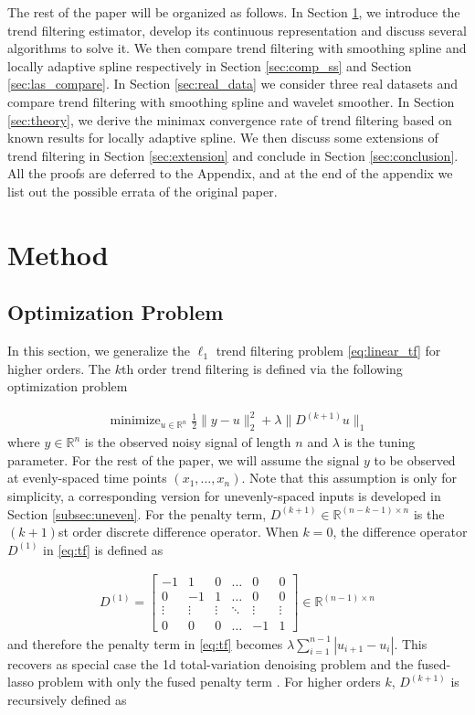\documentclass[a4paper]{article}
\newcommand{\RR}{\mathbb{R}}
\DeclareMathOperator*{\minimize}{minimize}
\begin{document}
The rest of the paper will be organized as follows. In Section \ref{sec:method}, we introduce the trend filtering estimator, develop its continuous representation and discuss several algorithms to solve it. We then compare trend filtering with smoothing spline and locally adaptive spline respectively in Section \ref{sec:comp_ss} and Section \ref{sec:las_compare}. In Section \ref{sec:real_data}  we consider three real datasets and compare trend filtering with smoothing spline and wavelet smoother. In Section \ref{sec:theory}, we derive the minimax convergence rate of trend filtering based on known results for locally adaptive spline. We then discuss some extensions of trend filtering in Section \ref{sec:extension} and conclude in Section \ref{sec:conclusion}. All the proofs are deferred to the Appendix, and at the end of the appendix we list out the possible errata of the original paper.


\section{Method}
\label{sec:method}

\subsection{Optimization Problem}
\label{subsec:opt_problem}
In this section, we generalize the $\ell_1$ trend filtering problem \eqref{eq:linear_tf} for higher orders. The $k$th order trend filtering is defined via the following optimization problem

\begin{align}
\minimize_{u\in\RR^n} \frac{1}{2}\|y-u\|_2^2 + \lambda\|D^{(k+1)}u\|_1  
\label{eq:tf}
\end{align}
where $y\in\RR^n$ is the observed noisy signal of length $n$ and $\lambda$ is the tuning parameter. For the rest of the paper, we will assume the signal $y$ to be observed at evenly-spaced time points $(x_1,\ldots, x_n)$. Note that this assumption is only for simplicity, a corresponding version for unevenly-spaced inputs is developed in Section \ref{subsec:uneven}. For the penalty term, $D^{(k+1)}\in\RR^{(n-k-1)\times n}$ is the $(k+1)$st order discrete difference operator. When $k = 0$, the difference operator $D^{(1)}$ in \eqref{eq:tf} is defined as

\begin{align}
D^{(1)} =
\begin{bmatrix}
-1 & 1 & 0 & \ldots & 0 & 0\\
0 & -1 & 1 & \ldots & 0 & 0\\
\vdots & \vdots & \vdots & \ddots & \vdots & \vdots\\
0 & 0 & 0 & \ldots & -1 & 1
\end{bmatrix}\in\RR^{(n-1) \times n}
\label{eq:D_0}
\end{align}
and therefore the penalty term in \eqref{eq:tf} becomes $\lambda\sum_{i=1}^{n-1}|u_{i+1}- u_i|$. This recovers as special case the 1d total-variation denoising problem \cite{rudin1992nonlinear,harchaoui2010multiple} and the fused-lasso problem with only the fused penalty term \cite{tibshirani2005sparsity}. For higher orders $k$, $D^{(k+1)}$ is recursively defined as
\end{document}
